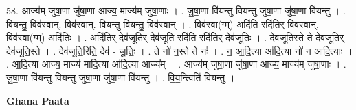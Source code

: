 \documentclass[17pt]{extarticle}
\begin{document}
58. आज्य॑म् जुषा॒णा जु॑षा॒णा आज्य॒ माज्य॑म् जुषा॒णाः । . जु॒षा॒णा वि॑यन्तु वियन्तु जुषा॒णा जु॑षा॒णा वि॑यन्तु । . वि॒य॒न्तु॒ विव॑स्वा॒न्॒. विव॑स्वान्. वियन्तु वियन्तु॒ विव॑स्वान् । . विव॑स्वा॒(ग्म्॒) अदि॑ति॒ रदि॑ति॒र् विव॑स्वा॒न्॒. विव॑स्वा॒(ग्म्॒) अदि॑तिः । . अदि॑ति॒र् देव॑जूति॒र् देव॑जूति॒ रदि॑ति॒ रदि॑ति॒र् देव॑जूतिः । . देव॑जूति॒स्ते ते देव॑जूति॒र् देव॑जूति॒स्ते । . देव॑जूति॒रिति॒ देव॑ - जू॒तिः॒ । . ते नो॑ न॒स्ते ते नः॑ । . न॒ आ॒दि॒त्या आ॑दि॒त्या नो॑ न आदि॒त्याः । . आ॒दि॒त्या आज्य॒ माज्य॑ मादि॒त्या आ॑दि॒त्या आज्य᳚म् । . आज्य॑म् जुषा॒णा जु॑षा॒णा आज्य॒ माज्य॑म् जुषा॒णाः । . जु॒षा॒णा वि॑यन्तु वियन्तु जुषा॒णा जु॑षा॒णा वि॑यन्तु । . वि॒य॒न्त्विति॑ वियन्तु । \newline

\textbf{Ghana Paata } \newline
\end{document}
